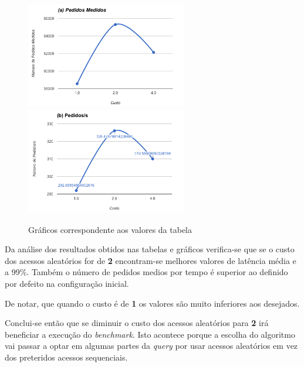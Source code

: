 \begin{figure}[ht!]
\centering
\includegraphics[width=70mm]{img/07_rpc_a.png}
\includegraphics[width=70mm]{img/07_rpc_b.png}
\caption{Gráficos correspondente aos valores da tabela \label{overflow}}
\end{figure}

Da análise dos resultados obtidos nas tabelas e gráficos verifica-se que se o custo dos acessos aleatórios for de \textbf{2} encontram-se melhores valores de latência média e a 99\%. Também o número de pedidos medios por tempo é superior ao definido por defeito na configuração inicial.

De notar, que quando o custo é de \textbf{1} os valores são muito inferiores aos desejados.

Conclui-se então que se diminuir o custo dos acessos aleatórios para \textbf{2} irá beneficiar a execução do \textit{benchmark}. Isto acontece porque a escolha do algoritmo vai passar a optar em algumas partes da \textit{query} por usar acessos aleatórios em vez dos preteridos acessos sequenciais.
